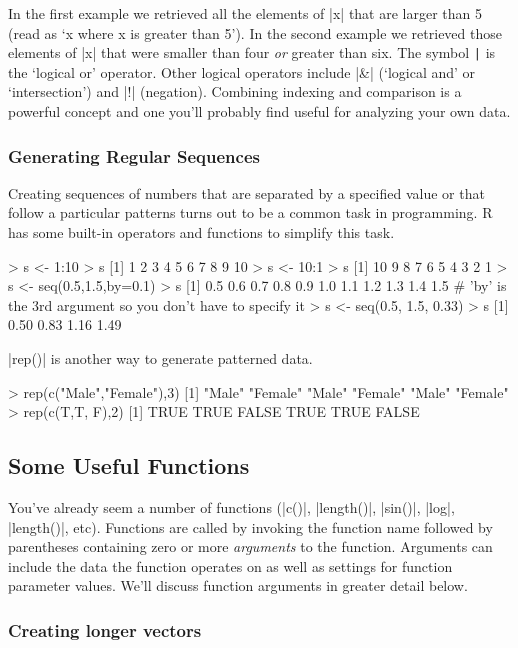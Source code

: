 In the first example we retrieved all the elements of |x| that are larger than
5 (read as `x where x is greater than 5'). In the second example we retrieved
those elements of |x| that were smaller than four \emph{or} greater than six.
The symbol \lstinline!|! is the `logical or' operator. Other logical operators
include |&| (`logical and' or `intersection') and |!| (negation). Combining
indexing and comparison is a powerful concept and one you'll probably find
useful for analyzing your own data.

\subsubsection{Generating Regular Sequences}

Creating sequences of numbers that are separated by a specified value or
that follow a particular patterns turns out to be a common task in
programming. R has some built-in operators and functions to simplify
this task.
%
\begin{R}
> s <- 1:10
> s
 [1]  1  2  3  4  5  6  7  8  9 10
> s <- 10:1
> s
 [1] 10  9  8  7  6  5  4  3  2  1
> s <- seq(0.5,1.5,by=0.1)
> s
 [1] 0.5 0.6 0.7 0.8 0.9 1.0 1.1 1.2 1.3 1.4 1.5
# 'by' is the 3rd argument so you don't have to specify it
> s <- seq(0.5, 1.5, 0.33)
> s
[1] 0.50 0.83 1.16 1.49
\end{R}

|rep()| is another way to generate patterned data.
%
\begin{R}
> rep(c("Male","Female"),3)
[1] "Male"   "Female" "Male"   "Female" "Male"   "Female"
> rep(c(T,T, F),2)
[1]  TRUE  TRUE FALSE  TRUE  TRUE FALSE
\end{R}


\subsection{Some Useful Functions}

You've already seem a number of functions (|c()|, |length()|, |sin()|,
|log|, |length()|, etc). Functions are called by
invoking the function name followed by parentheses containing zero or
more \emph{arguments} to the function. Arguments can include the data
the function operates on as well as settings for function parameter
values. We'll discuss function arguments in greater detail below.

\subsubsection{Creating longer vectors}

